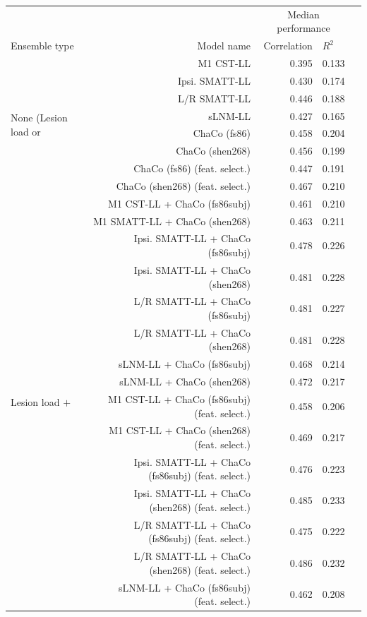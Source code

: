 \documentclass[phd,tocprelim]{cornell}
\def\Plus{\texttt{+}}
\begin{document}
\begin{table}[h]
\centering
\label{table:5}
\begin{scriptsize}
\begin{tabular}{lrrll}
\toprule
 &  & \multicolumn{2}{c}{Median performance} \\
Ensemble type & Model name & Correlation & $R^2$  \\
\midrule
\multirow[t]{8}{*}{None (Lesion load or} & M1 CST-LL & 0.395 & 0.133 \\
 ChaCo only)& Ipsi. SMATT-LL & 0.430 & 0.174 \\
 & L/R SMATT-LL & 0.446 & 0.188 \\
 & sLNM-LL & 0.427 & 0.165 \\
 & ChaCo (fs86) & 0.458 & 0.204 \\
 & ChaCo (shen268) & 0.456 & 0.199 \\
 & ChaCo (fs86) (feat. select.) & 0.447 & 0.191 \\
 & ChaCo (shen268) (feat. select.) & 0.467 & 0.210 \\
\multirow[t]{16}{*}{Lesion load $\Plus$} & M1 CST-LL + ChaCo (fs86subj) & 0.461 & 0.210 \\
 ChaCo & M1 SMATT-LL + ChaCo (shen268) & 0.463 & 0.211 \\
 & Ipsi. SMATT-LL + ChaCo (fs86subj) & 0.478 & 0.226 \\
 & Ipsi. SMATT-LL + ChaCo (shen268) & 0.481 & 0.228 \\
 & L/R SMATT-LL + ChaCo (fs86subj) & 0.481 & 0.227 \\
 & L/R SMATT-LL + ChaCo (shen268) & 0.481 & 0.228 \\
 & sLNM-LL + ChaCo (fs86subj) & 0.468 & 0.214 \\
 & sLNM-LL + ChaCo (shen268) & 0.472 & 0.217 \\
 & M1 CST-LL + ChaCo (fs86subj) (feat. select.) & 0.458 & 0.206 \\
 & M1 CST-LL + ChaCo (shen268) (feat. select.) & 0.469 & 0.217 \\
 & Ipsi. SMATT-LL + ChaCo (fs86subj) (feat. select.) & 0.476 & 0.223 \\
 & Ipsi. SMATT-LL + ChaCo (shen268) (feat. select.) & 0.485 & 0.233 \\
 & L/R SMATT-LL + ChaCo (fs86subj) (feat. select.) & 0.475 & 0.222 \\
 & L/R SMATT-LL + ChaCo (shen268) (feat. select.) & 0.486 & 0.232 \\
 & sLNM-LL + ChaCo (fs86subj) (feat. select.) & 0.462 & 0.208 \\

\end{tabular}
\end{scriptsize}
\end{table}
\end{document}

